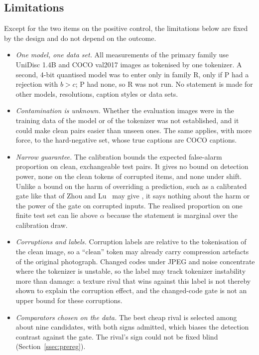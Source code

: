 \subsection{Limitations}\label{ssec:limits}
Except for the two items on the positive control, the limitations below are fixed by the design and do not depend on the outcome.
\begin{itemize}
\item \emph{One model, one data set.} All measurements of the primary family use UniDisc 1.4B and COCO val2017 images as tokenised
by one tokenizer. A second, 4-bit quantised model was to enter only in family R, only if P had a rejection with $b>c$; P had none, so R
was not run. No statement is made for other models, resolutions, caption styles or data sets.
\item \emph{Contamination is unknown.} Whether the evaluation images were in the training data of the model or of the tokenizer was not
established, and it could make clean pairs easier than unseen ones. The same applies, with more force, to the hard-negative set,
whose true captions are COCO captions.
\item \emph{Narrow guarantee.} The calibration bounds the expected false-alarm proportion on clean, exchangeable test pairs. It gives
no bound on detection power, none on the clean tokens of corrupted items, and none under shift. Unlike a bound on
the harm of overriding a prediction, such as a calibrated gate like that of Zhou and Lu~\cite{zhou2027burden} may give , it says nothing about the harm or the power of the gate
on corrupted inputs. The realised proportion on one finite test set can lie above $\alpha$ because the statement is marginal over the
calibration draw.
\item \emph{Corruptions and labels.} Corruption labels are relative to the tokenisation of the clean image, so a ``clean'' token
may already carry compression artefacts of the original photograph. Changed codes under JPEG and noise concentrate where the tokenizer
is unstable, so the label may track tokenizer instability more than damage: a texture rival that wins against this label is not
thereby shown to explain the corruption effect, and the changed-code gate is not an upper bound for these corruptions.
\item \emph{Comparators chosen on the data.} The best cheap rival is selected among about nine candidates, with both signs admitted, which
biases the detection contrast against the gate. The rival's sign could not be fixed blind (Section~\ref{ssec:prereg}).

\end{itemize}

